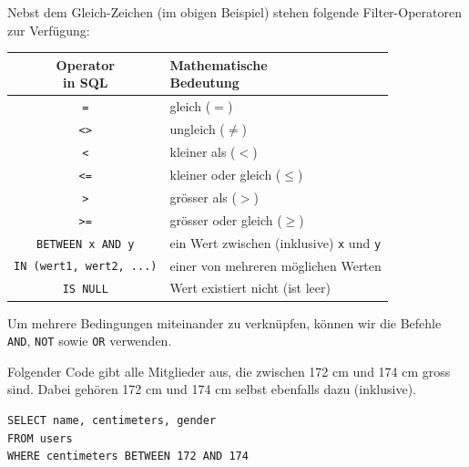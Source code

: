Nebst dem Gleich-Zeichen (im obigen Beispiel) stehen folgende Filter-Operatoren zur Verfügung:
\begin{table}[H]
  \centering
  \begin{tabular}{c|l}
    \makecell{\textbf{Operator}                                                                 \\\textbf{in \gls{SQL}}} & \makecell{\textbf{Mathematische}\\\textbf{Bedeutung}} \\\midrule
    \texttt{=}                                    & gleich ($=$)                                \\
    \texttt{<>}                                   & ungleich ($\neq$)                           \\
    \texttt{<}                                    & kleiner als ($<$)                           \\
    \texttt{<=}                                   & kleiner oder gleich ($\leq$)                \\
    \texttt{>}                                    & grösser als ($>$)                           \\
    \texttt{>=}                                   & grösser oder gleich ($\geq$)                \\
    \lstinline|BETWEEN x AND y|        & ein Wert zwischen (inklusive) \texttt{x} und \texttt{y} \\
    \lstinline|IN (wert1, wert2, ...)| & einer von mehreren möglichen Werten         \\
    \lstinline|IS NULL|                & Wert existiert nicht (ist leer)                        \\
  \end{tabular}
\end{table}
Um mehrere Bedingungen miteinander zu verknüpfen, können wir die Befehle \lstinline|AND|, \lstinline|NOT| sowie \lstinline|OR| verwenden.

\begin{myexample}\label{myexample:between}
Folgender Code gibt alle Mitglieder aus, die zwischen 172 cm und 174 cm gross sind. Dabei gehören 172 cm und 174 cm selbst ebenfalls dazu (inklusive).

\begin{lstlisting}
SELECT name, centimeters, gender 
FROM users 
WHERE centimeters BETWEEN 172 AND 174 
\end{lstlisting}
\end{myexample}

